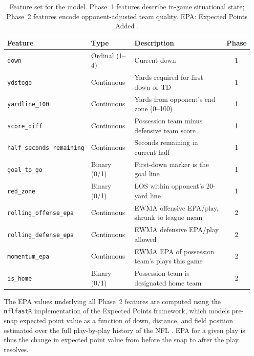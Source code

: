 \begin{table}[htbp]
  \centering
  \caption{Feature set for the \xscore{} model. Phase~1 features describe
           in-game situational state; Phase~2 features encode opponent-adjusted
           team quality. EPA: Expected Points Added
           \parencite{yurko2019nflwar}.}
  \label{tab:features}
  \small
  \begin{tabularx}{\textwidth}{l l X c}
    \toprule
    \textbf{Feature} & \textbf{Type} & \textbf{Description} & \textbf{Phase} \\
    \midrule
    \texttt{down}                     & Ordinal (1--4) & Current down & 1 \\
    \texttt{ydstogo}                  & Continuous     & Yards required for first down or TD & 1 \\
    \texttt{yardline\_100}            & Continuous     & Yards from opponent's end zone (0--100) & 1 \\
    \texttt{score\_diff}              & Continuous     & Possession team minus defensive team score & 1 \\
    \texttt{half\_seconds\_remaining} & Continuous     & Seconds remaining in current half & 1 \\
    \texttt{goal\_to\_go}             & Binary (0/1)   & First-down marker is the goal line & 1 \\
    \texttt{red\_zone}                & Binary (0/1)   & LOS within opponent's 20-yard line & 1 \\
    \midrule
    \texttt{rolling\_offense\_epa}    & Continuous     & EWMA offensive EPA/play, shrunk to league mean & 2 \\
    \texttt{rolling\_defense\_epa}    & Continuous     & EWMA defensive EPA/play allowed & 2 \\
    \texttt{momentum\_epa}            & Continuous     & EWMA EPA of possession team's plays this game & 2 \\
    \texttt{is\_home}                 & Binary (0/1)   & Possession team is designated home team & 2 \\
    \bottomrule
  \end{tabularx}
\end{table}

The EPA values underlying all Phase~2 features are computed using the
\texttt{nflfastR} implementation of the Expected Points framework, which
models pre-snap expected point value as a function of down, distance, and
field position estimated over the full play-by-play history of the NFL
\parencite{yurko2019nflwar}. EPA for a given play is thus the change in
expected point value from before the snap to after the play resolves.


